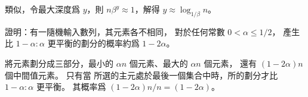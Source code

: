 類似，令最大深度爲 $y$，則 $n\beta^y\approx 1$，解得 $y\approx\log_{1/\beta}{n}$。
\stopANSWER

證明：有一隨機輸入數列，其元素各不相同，
對於任何常數 $0<\alpha\le 1/2$，
  產生比 $1-\alpha : \alpha$ 更平衡的劃分的概率約爲 $1-2\alpha$。
\stopEXERCISE

\startANSWER
將元素劃分成三部分，最小的 $\alpha n$ 個元素、最大的 $\alpha n$ 個元素，
還有 $(1-2\alpha)n$ 個中間值元素。
只有當  所選的主元處於最後一個集合中時，所的劃分才比 $1-\alpha : \alpha$ 更平衡。
其概率爲 $(1-2\alpha)n / n = (1-2\alpha)$。
\stopANSWER

\stopsection
